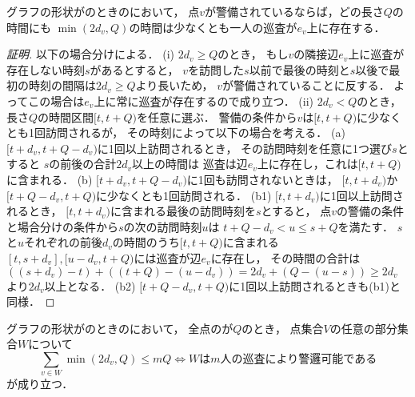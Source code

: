 \begin{lemm}
\label{lemm:star_cost_of_vertex}
グラフの形状が{\graphStar}のときの{\patProb}において，
点$v$が警備されているならば，どの長さ$Q$の時間にも
$\min(2d_v, Q)$の時間は少なくとも一人の巡査が$e_v$上に存在する．
\end{lemm}
\begin{proof}[証明]
以下の場合分けによる．
(i) $2d_v \geq Q$のとき，
もし$v$の隣接辺$e_v$上に巡査が存在しない時刻$s$があるとすると，
$v$を訪問した$s$以前で最後の時刻と$s$以後で最初の時刻の間隔は$2d_v \geq Q$より長いため，
$v$が警備されていることに反する．
よってこの場合は$e_v$上に常に巡査が存在するので成り立つ．
%
(ii) $2d_v < Q$のとき，
長さ$Q$の時間区間$[t, t + Q)$を任意に選ぶ．
警備の条件から$v$は$[t, t + Q)$に少なくとも1回訪問されるが，
その時刻によって以下の場合を考える．
%
(a) $[t + d_v, t + Q - d_v)$に1回以上訪問されるとき，
その訪問時刻を任意に1つ選び$s$とすると
$s$の前後の合計$2d_v$以上の時間は
巡査は辺$e_v$上に存在し，これは$[t, t + Q)$に含まれる．
%
(b) $[t + d_v, t + Q - d_v)$に1回も訪問されないときは，
$[t, t + d_v)$か$[t + Q - d_v, t + Q)$に少なくとも1回訪問される．
(b1) $[t, t + d_v)$に1回以上訪問されるとき，
$[t, t + d_v)$に含まれる最後の訪問時刻を$s$とすると，
点$v$の警備の条件と場合分けの条件から$s$の次の訪問時刻$u$は
$t + Q - d_v < u \leq s + Q$を満たす．
$s$と$u$それぞれの前後$d_v$の時間のうち$[t, t + Q)$に含まれる
$[t, s + d_v], [u - d_v, t + Q)$には巡査が辺$e_v$に存在し，
その時間の合計は
$((s + d_v) - t) + ((t + Q) - (u - d_v)) = 2d_v + (Q - (u - s)) \geq 2d_v$
より$2d_v$以上となる．
(b2) $[t + Q - d_v, t + Q)$に1回以上訪問されるときも(b1)と同様．
\end{proof}



\begin{lemm}
\label{lemm:condition_of_guarding_star}
グラフの形状が{\graphStar}のときの{\patProb}において，
全点の{\maxIdletime}が$Q$のとき，
点集合$V$の任意の部分集合$W$について
$$
\sum_{v \in W} \min(2d_v, Q) \leq mQ
\iff \textrm{$W$は$m$人の巡査により警邏可能である}
$$
が成り立つ．
\end{lemm}

